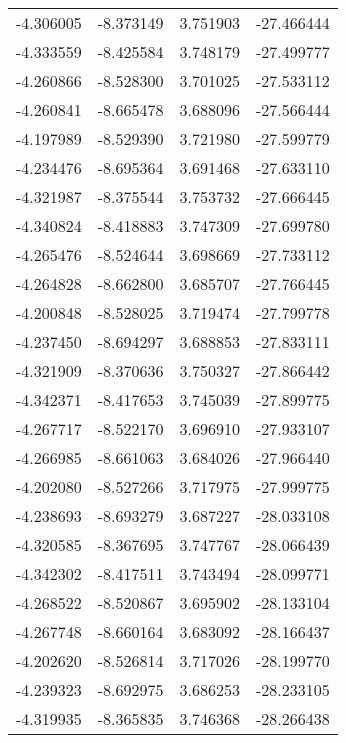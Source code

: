 \begin{tabular}{rrrr}
       -4.306005 &        -8.373149 &    3.751903 & -27.466444 \\
       -4.333559 &        -8.425584 &    3.748179 & -27.499777 \\
       -4.260866 &        -8.528300 &    3.701025 & -27.533112 \\
       -4.260841 &        -8.665478 &    3.688096 & -27.566444 \\
       -4.197989 &        -8.529390 &    3.721980 & -27.599779 \\
       -4.234476 &        -8.695364 &    3.691468 & -27.633110 \\
       -4.321987 &        -8.375544 &    3.753732 & -27.666445 \\
       -4.340824 &        -8.418883 &    3.747309 & -27.699780 \\
       -4.265476 &        -8.524644 &    3.698669 & -27.733112 \\
       -4.264828 &        -8.662800 &    3.685707 & -27.766445 \\
       -4.200848 &        -8.528025 &    3.719474 & -27.799778 \\
       -4.237450 &        -8.694297 &    3.688853 & -27.833111 \\
       -4.321909 &        -8.370636 &    3.750327 & -27.866442 \\
       -4.342371 &        -8.417653 &    3.745039 & -27.899775 \\
       -4.267717 &        -8.522170 &    3.696910 & -27.933107 \\
       -4.266985 &        -8.661063 &    3.684026 & -27.966440 \\
       -4.202080 &        -8.527266 &    3.717975 & -27.999775 \\
       -4.238693 &        -8.693279 &    3.687227 & -28.033108 \\
       -4.320585 &        -8.367695 &    3.747767 & -28.066439 \\
       -4.342302 &        -8.417511 &    3.743494 & -28.099771 \\
       -4.268522 &        -8.520867 &    3.695902 & -28.133104 \\
       -4.267748 &        -8.660164 &    3.683092 & -28.166437 \\
       -4.202620 &        -8.526814 &    3.717026 & -28.199770 \\
       -4.239323 &        -8.692975 &    3.686253 & -28.233105 \\
       -4.319935 &        -8.365835 &    3.746368 & -28.266438 \\

\end{tabular}
